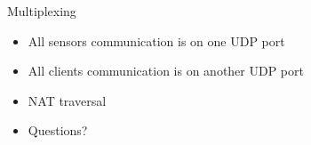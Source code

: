 \documentclass{beamer}
\begin{document}
\begin{frame}{Multiplexing}
  \begin{itemize}
     \item All sensors communication is on one UDP port
     \item All clients communication is on another UDP port
     \item NAT traversal
  \end{itemize}
\end{frame}

\begin{frame}
    \begin{itemize}
        \item Questions?
    \end{itemize}
\end{frame}
\end{document}
